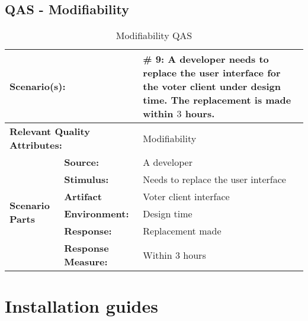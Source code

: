 \section{QAS - Modifiability}
\label{sec:the_remaining_qas:Modifiability}
\begin{table}[H]
\begin{center}
\begin{tabular}{|p{0.3cm}|p{2.5cm}|p{8cm}|}
  \hline
  \multicolumn{2}{|p{3cm}|}{\bfseries Scenario(s):} & \#  9: A developer needs to replace the user interface for the voter client under design time. The replacement is made within $3$ hours.\\
  \hline
  \multicolumn{2}{|p{3cm}|}{\bfseries Relevant Quality Attributes:} & Modifiability\\
  \hline
  \multirow{6}{*}{\begin{sideways}{\bfseries Scenario Parts}\end{sideways}}
  & {\bfseries Source:} & A developer \\
  \cline{2-3}
  & {\bfseries Stimulus:} & Needs to replace the user interface \\
  \cline{2-3}
  & {\bfseries Artifact} &  Voter client interface \\
  \cline{2-3}
  & {\bfseries Environment:} &  Design time \\
  \cline{2-3}
  & {\bfseries Response:} &  Replacement made\\
  \cline{2-3}
  & {\bfseries Response Measure:} &  Within 3 hours\\
  \hline
\end{tabular}
\caption{Modifiability QAS}
\end{center}
\end{table}

\chapter{Installation guides}

